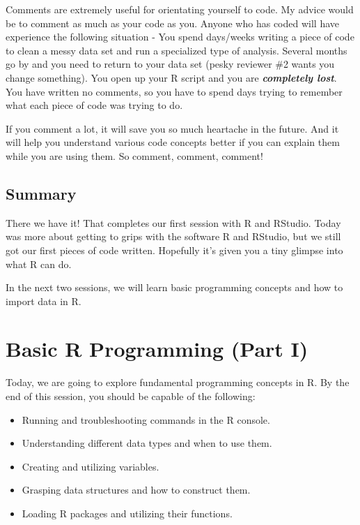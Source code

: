 \documentclass[
]{book}
\providecommand{\tightlist}{%
  \setlength{\itemsep}{0pt}\setlength{\parskip}{0pt}}
\begin{document}
Comments are extremely useful for orientating yourself to code. My advice would be to comment as much as your code as you. Anyone who has coded will have experience the following situation - You spend days/weeks writing a piece of code to clean a messy data set and run a specialized type of analysis. Several months go by and you need to return to your data set (pesky reviewer \#2 wants you change something). You open up your R script and you are \textbf{\emph{completely lost}}. You have written no comments, so you have to spend days trying to remember what each piece of code was trying to do.

If you comment a lot, it will save you so much heartache in the future. And it will help you understand various code concepts better if you can explain them while you are using them. So comment, comment, comment!

\hypertarget{summary}{%
\section{Summary}\label{summary}}

There we have it! That completes our first session with R and RStudio. Today was more about getting to grips with the software R and RStudio, but we still got our first pieces of code written. Hopefully it's given you a tiny glimpse into what R can do.

In the next two sessions, we will learn basic programming concepts and how to import data in R.

\hypertarget{programming1}{%
\chapter{Basic R Programming (Part I)}\label{programming1}}

Today, we are going to explore fundamental programming concepts in R. By the end of this session, you should be capable of the following:

\begin{itemize}
\tightlist
\item
  Running and troubleshooting commands in the R console.
\item
  Understanding different data types and when to use them.
\item
  Creating and utilizing variables.
\item
  Grasping data structures and how to construct them.
\item
  Loading R packages and utilizing their functions.
\end{itemize}
\end{document}
